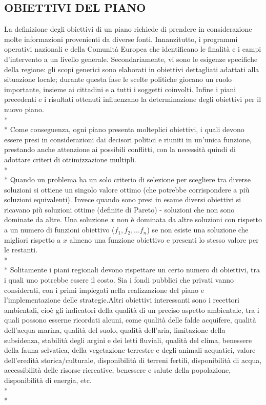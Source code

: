 \documentclass[12pt,a4paper,openright,twoside]{report}
\begin{document}
\subsection[OBIETTIVI]{\nohyphens{OBIETTIVI DEL PIANO}}
La definizione degli obiettivi di un piano richiede di prendere  in considerazione molte informazioni provenienti da diverse fonti. Innanzitutto, i programmi operativi nazionali e della Comunità Europea che identificano le finalità e i campi d'intervento a un livello generale. Secondariamente, vi sono le esigenze specifiche della regione: gli scopi generici sono elaborati in obiettivi dettagliati adattati alla situazione locale; durante questa fase le scelte politiche giocano un ruolo importante, insieme ai cittadini e a tutti i soggetti coinvolti. Infine i piani precedenti e i risultati ottenuti influenzano la determinazione degli obiettivi per il nuovo piano.\\*\\*
Come conseguenza, ogni piano presenta molteplici obiettivi, i quali devono essere presi in considerazioni dai decisori politici e riuniti in un'unica funzione, prestando anche attenzione ai possibili conflitti, con la necessità quindi di adottare criteri di ottimizzazione multipli.\\*\\*
Quando un problema ha un solo criterio di selezione per scegliere tra diverse soluzioni si ottiene un singolo valore ottimo (che potrebbe corrispondere a più soluzioni equivalenti). Invece quando sono presi in esame diversi obiettivi si ricavano più soluzioni ottime (definite di Pareto) - soluzioni che non sono dominate da altre. Una soluzione $x$ non è dominata da altre soluzioni con rispetto a un numero di funzioni obiettivo ($f_1, f_2, ...f_n$) se non esiste una soluzione che migliori rispetto a $x$ almeno una funzione obiettivo e presenti lo stesso valore per le restanti.\\*\\*
Solitamente i piani regionali devono rispettare un certo numero di obiettivi, tra i quali uno potrebbe essere il costo. Sia i fondi pubblici che privati vanno considerati, con i primi impiegati nella realizzazione del piano e l'implementazione delle strategie.Altri obiettivi interessanti sono i recettori ambientali, cioè gli indicatori della qualità di un preciso aspetto ambientale, tra i quali possono esserne ricordati alcuni, come qualità delle falde acquifere, qualità dell'acqua marina, qualità del suolo, qualità dell'aria, limitazione della subsidenza, stabilità degli argini e dei letti fluviali, qualità del clima, benessere della fauna selvatica, della vegetazione terrestre e degli animali acquatici, valore dell'eredità storica/culturale, disponibilità di terreni fertili, disponibilità di acqua, accessibilità delle risorse ricreative, benessere e salute della popolazione, disponibilità di energia, etc.\\*\\*
\end{document}
